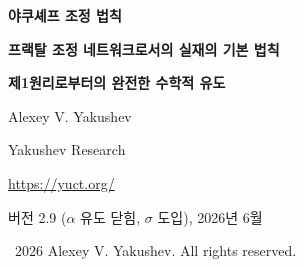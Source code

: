 \documentclass[12pt,a4paper]{article}
\theoremstyle{remark}
\begin{document}
	
	\begin{titlepage}
		\centering
		\vspace*{2cm}
		
		{\Huge\bfseries 야쿠셰프 조정 법칙\par}
		\vspace{0.5cm}
		{\Large\bfseries 프랙탈 조정 네트워크로서의 실재의 기본 법칙\par}
		\vspace{0.3cm}
		{\Large\bfseries 제1원리로부터의 완전한 수학적 유도\par}
		
		\vspace{1.5cm}
		
		{\large Alexey V. Yakushev\par}
		\vspace{0.3cm}
		{\normalsize Yakushev Research\par}
		\vspace{0.2cm}
		{\normalsize \url{https://yuct.org/}\par}
		
		\vspace{1.0cm}
		{\normalsize 버전 2.9 ($\alpha$ 유도 닫힘, $\sigma$ 도입), 2026년 6월\par}
		
		\vfill
		
		\begin{abstract}
			\noindent
			우리는 우주의 모든 안정적인 구조를 지배하는 기본 원리인 야쿠셰프 조정 법칙의 완전한 수학적 유도를 제시한다. 이 법칙은 하나의 문장으로 정식화되며, 하나의 공리(프랙탈 척도 불변성)와 조정 프로토콜 YPSDC의 정의로부터 유도된다. 우리는 세 가지 구조적 정리를 증명한다: 최소 사전 엔트로피는 정확히 2비트이며, 공간 차원은 필연적으로 3이고, 시간은 조정 불완전성의 창발적 척도이다. 보편적 오차 법칙은 올바른 정상상태 거듭제곱 형태 $\varepsilon = \kappa_c \alpha K_{\mathrm{eff}}^{-\beta}$로 유도되며, 여기서 $\beta=2/3$, $\kappa_c=1/3$이다. 대수적 루프 상수는 $S_{\mathrm{odd}}=1.2$, $S_{\mathrm{even}}=0.8$이다. 척도 양자 $q = (3/2)^{1/3}$는 보편적 질량 사다리를 생성한다. 미세구조상수 $\alpha^{-1} \approx 137.036$은 콤팩트 파이버 $F_{18}$의 위상 불변량과 보편적 이동 $\sigma = (S_{\mathrm{odd}}-S_{\mathrm{even}})/2 = 0.20$로부터 어떤 경험적 피팅 없이 유도된다. 우주상수 $\Omega_\Lambda = 2/3$는 동일한 위상에서 비롯된다. 전약력 눈금은 바일 페르미온 개수 $L=96$과 기하학적 조절자 $(\kappa_c\pi_{\mathrm{YUCT}})^{-1/2}$로부터 얻어지며, 어떠한 현상론적 피팅도 제거한다. 또한, 동일한 대수적 루프가 소수 분포에 대한 매개변수 없는 점근적 보정(정리~4)을 제공한다. 세 가지 형식화된 공준—보편적 오차 법칙, 양자화된 깊이, 위상 주기성—은 플랑크 척도에서 제한된 소수 변동에 대한 닫힌 해석적 모형을 제공한다. 이 법칙은 물리학, 생물학, 수론, 우주론에 걸쳐 여덟 가지 구체적이고 반증 가능한 예측을 하며, 조정 가능한 연속 매개변수를 전혀 포함하지 않는다.
		\end{abstract}
		
		\vspace{1cm}
		\textcopyright\ 2026 Alexey V. Yakushev. All rights reserved.
	\end{titlepage}
	
\end{document}
